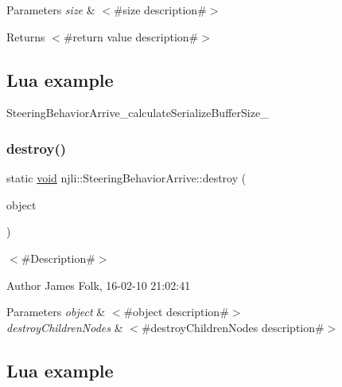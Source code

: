 \begin{DoxyParams}{Parameters}
{\em size} & $<$\#size description\#$>$\\
\hline
\end{DoxyParams}
\begin{DoxyReturn}{Returns}
$<$\#return value description\#$>$
\end{DoxyReturn}
\hypertarget{classnjli_1_1_steering_behavior_wander_ex1}{}\subsection{Lua example}\label{classnjli_1_1_steering_behavior_wander_ex1}

\begin{DoxyCodeInclude}
\end{DoxyCodeInclude}
Steering\+Behavior\+Arrive\+\_\+calculate\+Serialize\+Buffer\+Size\+\_\+ \mbox{\label{classnjli_1_1_steering_behavior_arrive_a866a9a6076e51f1134dd0b2891780128}} 
\subsubsection{\texorpdfstring{destroy()}{destroy()}}
{\footnotesize\ttfamily static \mbox{\hyperlink{_thread_8h_af1e856da2e658414cb2456cb6f7ebc66}{void}} njli\+::\+Steering\+Behavior\+Arrive\+::destroy (\begin{DoxyParamCaption}\item[{\mbox{\hyperlink{classnjli_1_1_steering_behavior_arrive}{Steering\+Behavior\+Arrive}} $\ast$}]{object }\end{DoxyParamCaption})\hspace{0.3cm}{\ttfamily [static]}}



$<$\#\+Description\#$>$ 

\begin{DoxyAuthor}{Author}
James Folk, 16-\/02-\/10 21\+:02\+:41
\end{DoxyAuthor}

\begin{DoxyParams}{Parameters}
{\em object} & $<$\#object description\#$>$ \\
\hline
{\em destroy\+Children\+Nodes} & $<$\#destroy\+Children\+Nodes description\#$>$\\
\hline
\end{DoxyParams}
\hypertarget{classnjli_1_1_steering_behavior_wander_ex1}{}\subsection{Lua example}\label{classnjli_1_1_steering_behavior_wander_ex1}

